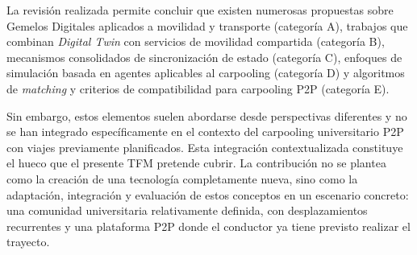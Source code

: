La revisión realizada permite concluir que existen numerosas propuestas sobre Gemelos Digitales aplicados a movilidad y transporte (categoría A), trabajos que combinan \textit{Digital Twin} con servicios de movilidad compartida (categoría B), mecanismos consolidados de sincronización de estado (categoría C), enfoques de simulación basada en agentes aplicables al carpooling (categoría D) y algoritmos de \textit{matching} y criterios de compatibilidad para carpooling P2P (categoría E). 

Sin embargo, estos elementos suelen abordarse desde perspectivas diferentes y no se han integrado específicamente en el contexto del carpooling universitario P2P con viajes previamente planificados. Esta integración contextualizada constituye el hueco que el presente TFM pretende cubrir. La contribución no se plantea como la creación de una tecnología completamente nueva, sino como la adaptación, integración y evaluación de estos conceptos en un escenario concreto: una comunidad universitaria relativamente definida, con desplazamientos recurrentes y una plataforma P2P donde el conductor ya tiene previsto realizar el trayecto.
